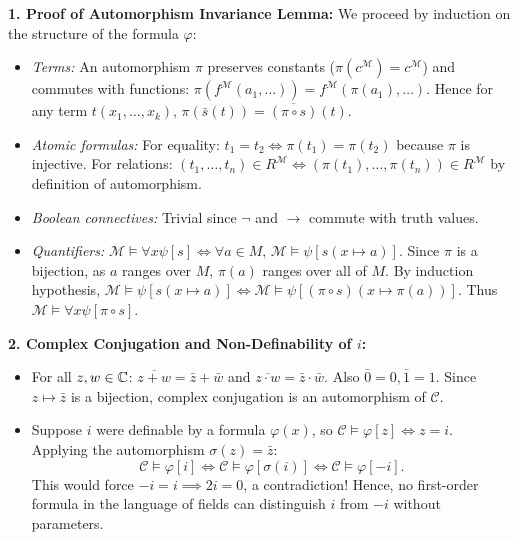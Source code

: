 \begin{solution}
\textbf{1. Proof of Automorphism Invariance Lemma:}
We proceed by induction on the structure of the formula $\varphi$:
\begin{itemize}[leftmargin=1.4em,itemsep=2pt]
  \item \textit{Terms:} An automorphism $\pi$ preserves constants ($\pi(c^\mathcal{M}) = c^\mathcal{M}$) and commutes with functions: $\pi(f^\mathcal{M}(a_1, \dots)) = f^\mathcal{M}(\pi(a_1), \dots)$.
  Hence for any term $t(x_1, \dots, x_k)$, $\pi(\bar{s}(t)) = \overline{(\pi \circ s)}(t)$.
  \item \textit{Atomic formulas:} For equality: $t_1 = t_2 \iff \pi(t_1) = \pi(t_2)$ because $\pi$ is injective.
  For relations: $(t_1, \dots, t_n) \in R^\mathcal{M} \iff (\pi(t_1), \dots, \pi(t_n)) \in R^\mathcal{M}$ by definition of automorphism.
  \item \textit{Boolean connectives:} Trivial since $\neg$ and $\to$ commute with truth values.
  \item \textit{Quantifiers:} $\mathcal{M} \models \forall x \psi[s] \iff \forall a \in M,\, \mathcal{M} \models \psi[s(x \mapsto a)]$.
  Since $\pi$ is a bijection, as $a$ ranges over $M$, $\pi(a)$ ranges over all of $M$.
  By induction hypothesis, $\mathcal{M} \models \psi[s(x \mapsto a)] \iff \mathcal{M} \models \psi[(\pi \circ s)(x \mapsto \pi(a))]$.
  Thus $\mathcal{M} \models \forall x \psi[\pi \circ s]$.
\end{itemize}

\textbf{2. Complex Conjugation and Non-Definability of $i$:}
\begin{itemize}[leftmargin=1.4em,itemsep=2pt]
  \item For all $z, w \in \mathbb{C}$: $\overline{z + w} = \bar{z} + \bar{w}$ and $\overline{z \cdot w} = \bar{z} \cdot \bar{w}$. Also $\bar{0} = 0, \bar{1} = 1$.
  Since $z \mapsto \bar{z}$ is a bijection, complex conjugation is an automorphism of $\mathcal{C}$.
  \item Suppose $i$ were definable by a formula $\varphi(x)$, so $\mathcal{C} \models \varphi[z] \iff z = i$.
  Applying the automorphism $\sigma(z) = \bar{z}$:
  \[
  \mathcal{C} \models \varphi[i] \iff \mathcal{C} \models \varphi[\sigma(i)] \iff \mathcal{C} \models \varphi[-i].
  \]
  This would force $-i = i \implies 2i = 0$, a contradiction!
  Hence, no first-order formula in the language of fields can distinguish $i$ from $-i$ without parameters.
\end{itemize}


\end{solution}
